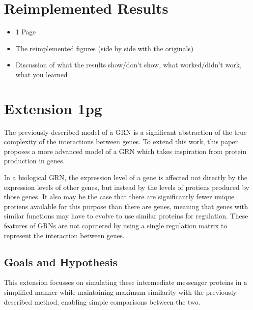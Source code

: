 \documentclass[twocolumn,a4paper]{article}
\begin{document}
    \section{Reimplemented Results}
    \begin{itemize}
        \item 1 Page
        \item The reimplemented figures (side by side with the originals)
        \item Discussion of what the results show/don't show, what worked/didn't work, what you learned
    \end{itemize}


    \section{Extension 1pg}
    The previously described model of a GRN is a significant abstraction of the true complexity of the interactions between genes. To extend this work, this paper proposes a more advanced model of a GRN which takes inspiration from protein production in genes.

    In a biological GRN, the expression level of a gene is affected not directly by the expression levels of other genes, but instead by the levels of protiens produced by those genes. It also may be the case that there are significantly fewer unique protiens available for this purpose than there are genes, meaning that genes with similar functions may have to evolve to use similar proteins for regulation. These features of GRNs are not caputered by using a single regulation matrix to represent the interaction between genes.

    \subsection{Goals and Hypothesis}
    This extension focusses on simulating these intermediate messenger proteins in a simplified manner while maintaining maximum similarity with the previously described method, enabling simple comparisons between the two.
\end{document}
